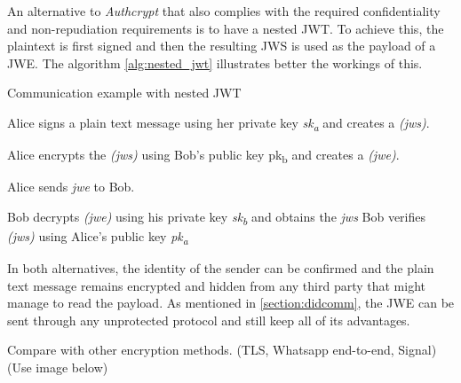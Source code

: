 An alternative to \emph{Authcrypt} that also complies with the required confidentiality and non-repudiation requirements is to have a nested JWT. To achieve this, the plaintext is first signed and then the resulting JWS is used as the payload of a JWE. The algorithm \ref{alg:nested_jwt} illustrates better the workings of this. 

\begin{algorithm}[H]
  \caption{Communication example with nested JWT}
  \label{alg:nested_jwt}
    \begin{algorithmic}[1]
      \State Alice signs a plain text message using her private key \emph{sk\textsubscript{a}} and creates a \emph{(jws)}.
  
      \State Alice encrypts the \emph{(jws)} using Bob's public key pk\textsubscript{b} and creates a \emph{(jwe)}.
  
      \State Alice sends \emph{jwe} to Bob.
  
      \State Bob decrypts \emph{(jwe)} using his private key \emph{sk\textsubscript{b}} and obtains the \emph{jws}
      \State Bob verifies \emph{(jws)} using Alice's public key \emph{pk\textsubscript{a}}
  \end{algorithmic}
\end{algorithm}
  
In both alternatives, the identity of the sender can be confirmed and the plain text message remains encrypted and hidden from any third party that might manage to read the payload. As mentioned in \autoref{section:didcomm}, the JWE can be sent through any unprotected protocol and still keep all of its advantages. 



Compare with other encryption methods. (TLS, Whatsapp end-to-end, Signal) (Use image below)
 